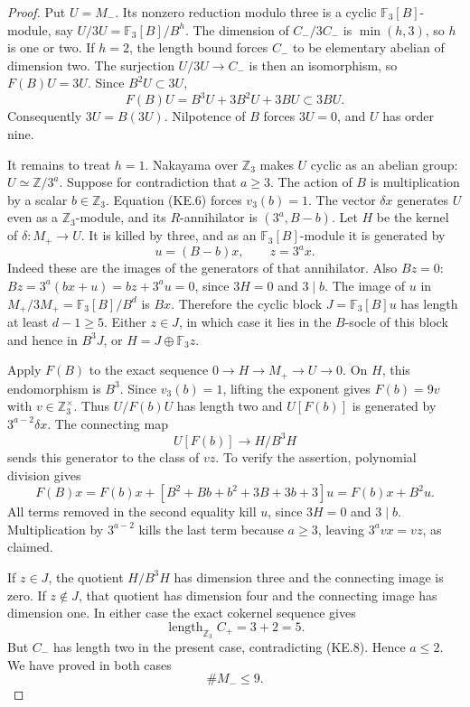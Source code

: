 \begin{proof}
Put $U=M_-$.  Its nonzero reduction modulo three is a
cyclic $\mathbb F_3[B]$-module, say
$U/3U=\mathbb F_3[B]/B^h$.
The dimension of $C_-/3C_-$ is $\min(h,3)$, so $h$ is
one or two.
If $h=2$, the length bound forces $C_-$ to be elementary
abelian of dimension two.  The surjection
$U/3U\to C_-$ is then an isomorphism, so
$F(B)U=3U$.  Since $B^2U\subset3U$,
\[
 F(B)U=B^3U+3B^2U+3BU\subset3BU.
\]
Consequently $3U=B(3U)$.  Nilpotence of $B$ forces
$3U=0$, and $U$ has order nine.

It remains to treat $h=1$.  Nakayama over $\mathbb Z_3$
makes $U$ cyclic as an abelian group: $U\simeq\mathbb Z/3^a$.
Suppose for contradiction that $a\geq3$.
The action of $B$ is multiplication by a scalar
$b\in\mathbb Z_3$.  Equation (KE.6) forces
$v_3(b)=1$.  The vector $\delta x$ generates $U$ even
as a $\mathbb Z_3$-module, and its $R$-annihilator is
$(3^a,B-b)$.
Let $H$ be the kernel of
$\delta:M_+\to U$.  It is killed by three, and as an
$\mathbb F_3[B]$-module it is generated by
\[
                    u=(B-b)x,
             \qquad z=3^a x.                          \tag{KE.9}
\]
Indeed these are the images of the generators of that
annihilator.  Also $Bz=0$:
$Bz=3^a(bx+u)=bz+3^au=0$, since $3H=0$ and $3\mid b$.
The image of $u$ in
$M_+/3M_+=\mathbb F_3[B]/B^d$ is $Bx$.
Therefore the cyclic block
$J=\mathbb F_3[B]u$ has length at least $d-1\geq5$.
Either $z\in J$, in which case it lies in the $B$-socle
of this block and hence in $B^3J$, or
$H=J\oplus\mathbb F_3z$.

Apply $F(B)$ to the exact sequence
$0\to H\to M_+\to U\to0$.
On $H$, this endomorphism is $B^3$.
Since $v_3(b)=1$, lifting the exponent gives
$F(b)=9v$ with $v\in\mathbb Z_3^\times$.
Thus $U/F(b)U$ has length two and $U[F(b)]$ is generated
by $3^{a-2}\delta x$.
The connecting map
\[
             U[F(b)]\longrightarrow H/B^3H
\]
sends this generator to the class of $vz$.
To verify the assertion, polynomial division gives
\[
 F(B)x=F(b)x+
 [B^2+Bb+b^2+3B+3b+3]u
       =F(b)x+B^2u.
\]
All terms removed in the second equality kill $u$, since
$3H=0$ and $3\mid b$.
Multiplication by $3^{a-2}$ kills the last term because
$a\geq3$, leaving $3^a vx=vz$, as claimed.

If $z\in J$, the quotient $H/B^3H$ has dimension three
and the connecting image is zero.
If $z\notin J$, that quotient has dimension four and
the connecting image has dimension one.
In either case the exact cokernel sequence gives
\[
              \operatorname{length}_{\mathbb Z_3}C_+
                         =3+2=5.
\]
But $C_-$ has length two in the present case, contradicting
(KE.8).  Hence $a\leq2$.  We have proved in both cases
\[
                          \#M_-\leq9.                \tag{KE.10}
\]


\end{proof}
